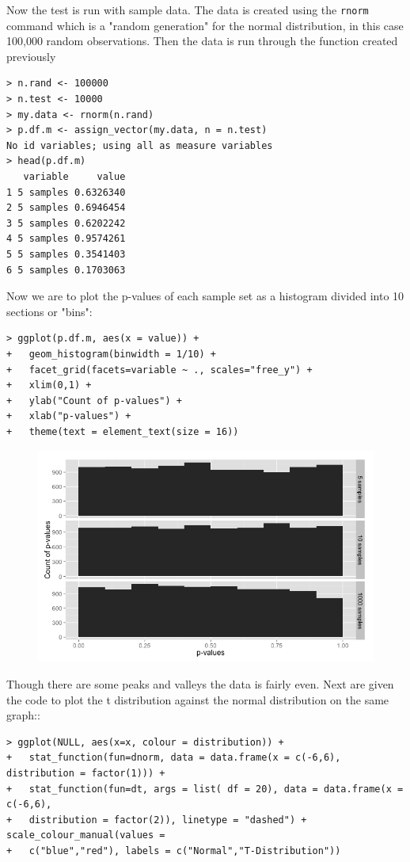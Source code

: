 \documentclass[10pt]{article}
\begin{document}
Now the test is run with sample data. The data is created using the \verb|rnorm| command which is a "random generation" for the normal distribution, in this case 100,000 random observations. Then the data is run through the function created previously 
\begin{verbatim}
> n.rand <- 100000
> n.test <- 10000
> my.data <- rnorm(n.rand)
> p.df.m <- assign_vector(my.data, n = n.test)
No id variables; using all as measure variables
> head(p.df.m)
   variable     value
1 5 samples 0.6326340
2 5 samples 0.6946454
3 5 samples 0.6202242
4 5 samples 0.9574261
5 5 samples 0.3541403
6 5 samples 0.1703063
\end{verbatim}
Now we are to plot the p-values of each sample set as a histogram divided into 10 sections or "bins":
\begin{verbatim}
> ggplot(p.df.m, aes(x = value)) + 
+   geom_histogram(binwidth = 1/10) + 
+   facet_grid(facets=variable ~ ., scales="free_y") + 
+   xlim(0,1) +
+   ylab("Count of p-values") +
+   xlab("p-values") +
+   theme(text = element_text(size = 16))
\end{verbatim}
\pagebreak
\begin{figure}[!h]
\includegraphics[scale=0.37]{pValueHistPlot.png}
\centering
\end{figure}
Though there are some peaks and valleys the data is fairly even. 
Next are given the code to plot the t distribution against the normal distribution on the same graph::
\begin{verbatim}
> ggplot(NULL, aes(x=x, colour = distribution)) + 
+   stat_function(fun=dnorm, data = data.frame(x = c(-6,6), distribution = factor(1))) + 
+   stat_function(fun=dt, args = list( df = 20), data = data.frame(x = c(-6,6), 
+   distribution = factor(2)), linetype = "dashed") +   scale_colour_manual(values = 
+   c("blue","red"), labels = c("Normal","T-Distribution"))
\end{verbatim}
\end{document}
